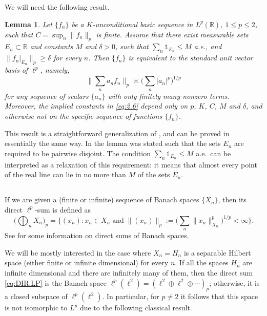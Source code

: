 \documentclass[reqno,a4paper,12pt]{amsart}
\numberwithin{equation}{section}
\numberwithin{figure}{section}
\newcommand\R{\mathbb{R}}
\newcommand\del{\delta}
\newcommand\1{\mathds{1}}
\renewcommand\le{\leqslant}
\renewcommand\ge{\geqslant}
\theoremstyle{plain}
\newtheorem{lem}[thm]{Lemma}
\theoremstyle{definition}
\begin{document}
\subsection{}
We will need the following result.

\begin{lem}\label{lem:JO.EXT}
Let $\{f_n\}$ be a $K$-unconditional basic sequence in $L^p(\R)$, $1\le p\le 2$,
such that  $C = \sup_n \|f_n\|_p$ is finite.
Assume that there exist measurable sets 
$E_n\subset\R$ and constants $M$ and $\del>0$, such that 
$\sum_n \1_{E_n}\le M$ a.e., and 
$\|f_n|_{E_n}\|_p\ge\delta$ for every $n$. 
Then $\{f_n\}$ is equivalent to the standard unit vector basis of $\ell^p$, namely,
\begin{equation}\label{eq:2.6}
\Big\| \sum_n a_n f_n \Big\|_p \asymp \Big( \sum_n |a_n|^p \Big)^{1/p}
\end{equation}
for any sequence of scalars
$\{a_n\}$ with only finitely many nonzero terms.
Moreover, the implied constants in \eqref{eq:2.6} depend only on $p$, $K$, $C$, $M$ and $\delta$, and otherwise not on the specific sequence of functions $\{f_n\}$. 
\end{lem}

This result is a straightforward generalization of 
\cite[Section 3, Lemma 2]{JO74}, and can be
proved in essentially the same way.
In \cite{JO74} the lemma was stated such that the sets
$E_n$ are required to be pairwise disjoint.
The condition $\sum_n \1_{E_n}\le M$ a.e.\ 
can be interpreted as a relaxation of this requirement:
 it means that almost every point of 
the real line can lie in no more than $M$ of the sets $E_n$.


\subsection{}

If we are given a (finite or infinite) sequence of Banach spaces $\{X_n\}$, then its direct $\ell^p$-sum is defined as
\begin{equation}
\label{eq:DIR.LP}
\Big(\bigoplus_n X_n\Big)_p = \Big\{(x_n) : x_n\in X_n \; \text{and} \; \|(x_n)\|_p := \Big(\sum_n \|x_n\|_{X_n}^p\Big)^{1/p} < \infty\Big\}.
\end{equation}
See \cite[II.B.21]{Woj91} for some information on direct sums of Banach spaces.

We will be mostly interested in the case where $X_n = H_n$ is a separable Hilbert space  (either finite or infinite dimensional) for every $n$. If all the spaces $H_n$ are infinite dimensional and there are infinitely many of them, then the direct sum \eqref{eq:DIR.LP} is the Banach space 
$\ell^p(\ell^2)=(\ell^2\oplus\ell^2\oplus\cdots)_p$; otherwise, it is a closed subspace of $\ell^p(\ell^2)$. In particular, for $p\neq 2$ it follows that this space is not isomorphic to $L^p$ due to the following classical result.
\end{document}
